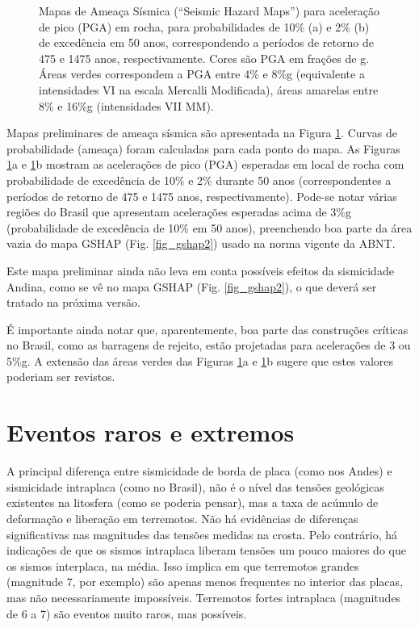 \documentclass[jgrga]{agutex}
\begin{document}
\begin{article}
\begin{figure}
\begin{tabular*}{\hsize}{
				p{0.5\hsize} 
				p{0.5\hsize}
				}
\\
\end{tabular*}
\caption{Mapas de Ameaça Sísmica (``Seismic Hazard Maps'') para aceleração de pico (PGA) em rocha, para probabilidades de 10\% (a) e 2\% (b) de excedência em 50 anos, correspondendo a períodos de retorno de 475 e 1475 anos, respectivamente. Cores são PGA em frações de g. Áreas verdes correspondem a PGA entre 4\% e 8\%g (equivalente a intensidades VI na escala Mercalli Modificada), áreas amarelas entre 8\% e 16\%g (intensidades VII MM).}
\label{fig_hazard}
\end{figure}



Mapas preliminares de ameaça sísmica são apresentada na Figura \ref{fig_hazard}. Curvas de probabilidade (ameaça) foram calculadas para cada ponto do mapa. As Figuras \ref{fig_hazard}a e \ref{fig_hazard}b mostram as acelerações de pico (PGA) esperadas em local de rocha com probabilidade de excedência de 10\% e 2\% durante 50 anos (correspondentes a períodos de retorno de 475 e 1475 anos, respectivamente). Pode-se notar várias regiões do Brasil que apresentam acelerações esperadas acima de 3\%g (probabilidade de excedência de 10\% em 50 anos), preenchendo boa parte da área vazia do mapa GSHAP (Fig. \ref{fig_gshap2}) usado na norma vigente da ABNT. 


Este mapa preliminar ainda não leva em conta possíveis efeitos da sismicidade Andina, como se vê no mapa GSHAP (Fig. \ref{fig_gshap2}), o que deverá ser tratado na próxima versão. 

É importante ainda notar que, aparentemente, boa parte das construções críticas no Brasil, como as barragens de rejeito, estão projetadas para acelerações de 3 ou 5\%g. A extensão das áreas verdes das Figuras \ref{fig_hazard}a e \ref{fig_hazard}b sugere que estes valores poderiam ser revistos. 

\section{Eventos raros e extremos}

A principal diferença entre sismicidade de borda de placa (como nos Andes) e sismicidade intraplaca (como no Brasil), não é o nível das tensões geológicas existentes na litosfera (como se poderia pensar), mas a taxa de acúmulo de deformação e liberação em terremotos. Não há evidências de diferenças significativas nas magnitudes das tensões medidas na crosta. Pelo contrário, há indicações de que os sismos intraplaca liberam tensões um pouco maiores do que os sismos interplaca, na média. Isso implica em que terremotos grandes (magnitude 7, por exemplo) são apenas menos frequentes no interior das placas, mas não necessariamente impossíveis. Terremotos fortes intraplaca (magnitudes de 6 a 7) são eventos muito raros, mas possíveis.


\end{article}
\end{document}
